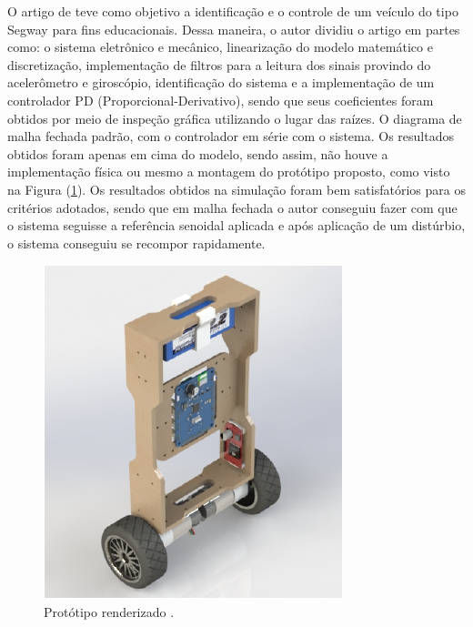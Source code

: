 O artigo de \cite{JVM:17} teve como objetivo a identificação e o controle de um veículo do tipo Segway para fins educacionais. Dessa maneira, o autor dividiu o artigo em partes como: o sistema eletrônico e mecânico, linearização do modelo matemático e discretização, implementação de filtros para a leitura dos sinais provindo do acelerômetro e giroscópio, identificação do sistema e a implementação de um controlador PD (Proporcional-Derivativo), sendo que seus coeficientes foram obtidos por meio de inspeção gráfica utilizando o lugar das raízes. O diagrama de malha fechada padrão, com o controlador em série com o sistema. Os resultados obtidos foram apenas em cima do modelo, sendo assim, não houve a implementação física ou mesmo a montagem do protótipo proposto, como visto na Figura (\ref{fig:estadoArte_REF2}). Os resultados obtidos na simulação foram bem satisfatórios para os critérios adotados, sendo que em malha fechada o autor conseguiu fazer com que o sistema seguisse a referência senoidal aplicada e após aplicação de um distúrbio, o sistema conseguiu se recompor rapidamente.
\begin{figure}[H]
    \centering
    \includegraphics[scale=0.8]{EstadoArte/REF2}
    \caption{Protótipo renderizado
    \citep{JVM:17}.}
    \label{fig:estadoArte_REF2}
\end{figure}

